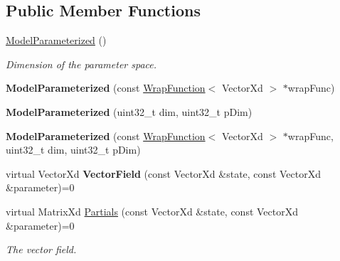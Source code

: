 \subsection*{Public Member Functions}
\begin{DoxyCompactItemize}
\item 
\hypertarget{struct_d_r_d_s_p_1_1_model_parameterized_aa410d930f96000a98a73cf132d5c2e2d}{\hyperlink{struct_d_r_d_s_p_1_1_model_parameterized_aa410d930f96000a98a73cf132d5c2e2d}{Model\-Parameterized} ()}\label{struct_d_r_d_s_p_1_1_model_parameterized_aa410d930f96000a98a73cf132d5c2e2d}

\begin{DoxyCompactList}\small\item\em Dimension of the parameter space. \end{DoxyCompactList}\item 
\hypertarget{struct_d_r_d_s_p_1_1_model_parameterized_a0cd93ae8805e21e731e65a732048c2b7}{{\bfseries Model\-Parameterized} (const \hyperlink{struct_d_r_d_s_p_1_1_wrap_function}{Wrap\-Function}$<$ Vector\-Xd $>$ $\ast$wrap\-Func)}\label{struct_d_r_d_s_p_1_1_model_parameterized_a0cd93ae8805e21e731e65a732048c2b7}

\item 
\hypertarget{struct_d_r_d_s_p_1_1_model_parameterized_ad23b430d7e7494f9c2142097391fc01d}{{\bfseries Model\-Parameterized} (uint32\-\_\-t dim, uint32\-\_\-t p\-Dim)}\label{struct_d_r_d_s_p_1_1_model_parameterized_ad23b430d7e7494f9c2142097391fc01d}

\item 
\hypertarget{struct_d_r_d_s_p_1_1_model_parameterized_a2f6be3362a944408c097b5981e6fbbaa}{{\bfseries Model\-Parameterized} (const \hyperlink{struct_d_r_d_s_p_1_1_wrap_function}{Wrap\-Function}$<$ Vector\-Xd $>$ $\ast$wrap\-Func, uint32\-\_\-t dim, uint32\-\_\-t p\-Dim)}\label{struct_d_r_d_s_p_1_1_model_parameterized_a2f6be3362a944408c097b5981e6fbbaa}

\item 
\hypertarget{struct_d_r_d_s_p_1_1_model_parameterized_a7fc3a7f0f10a3e4215bf67cb6e302e05}{virtual Vector\-Xd {\bfseries Vector\-Field} (const Vector\-Xd \&state, const Vector\-Xd \&parameter)=0}\label{struct_d_r_d_s_p_1_1_model_parameterized_a7fc3a7f0f10a3e4215bf67cb6e302e05}

\item 
\hypertarget{struct_d_r_d_s_p_1_1_model_parameterized_a1aa9163a2e1e92e8bc2e644832721de7}{virtual Matrix\-Xd \hyperlink{struct_d_r_d_s_p_1_1_model_parameterized_a1aa9163a2e1e92e8bc2e644832721de7}{Partials} (const Vector\-Xd \&state, const Vector\-Xd \&parameter)=0}\label{struct_d_r_d_s_p_1_1_model_parameterized_a1aa9163a2e1e92e8bc2e644832721de7}

\begin{DoxyCompactList}\small\item\em The vector field. \end{DoxyCompactList}\end{DoxyCompactItemize}
